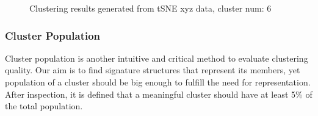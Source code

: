 \documentclass[a4paper]{article}
\begin{document}
\begin{figure}[H]
    \centering
    \caption{Clustering results generated from tSNE xyz data, cluster num: 6}
    \label{fig: clustering tSNE}
\end{figure}

\subsubsection{Cluster Population}
Cluster population is another intuitive and critical method to evaluate clustering quality. Our aim is to find signature structures that represent its members, yet population of a cluster should be big enough to fulfill the need for representation. After inspection, it is defined that a meaningful cluster should have at least 5\% of the total population.
\end{document}
